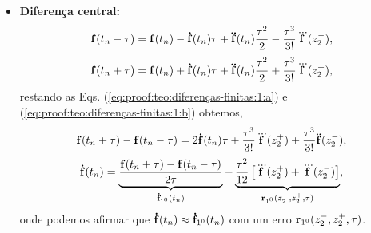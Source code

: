 \begin{myproofT}
\begin{itemize}
\item \textbf{Diferença central:} 
\begin{equation}\label{eq:proof:teo:diferenças-finitas:1:a}
\VECTOR{f}(t_n-\ToS) = \VECTOR{f}(t_n)-\DTVECTOR{f}(t_n)\ToS +\DDTVECTOR{f}(t_n) \frac{\ToS^2}{2}-\frac{\ToS^3}{3!}\DDDTVECTOR{f}(z_{2}^{-}),
\end{equation}
\begin{equation}\label{eq:proof:teo:diferenças-finitas:1:b}
\VECTOR{f}(t_n+\ToS) = \VECTOR{f}(t_n)+\DTVECTOR{f}(t_n)\ToS +\DDTVECTOR{f}(t_n) \frac{\ToS^2}{2}+\frac{\ToS^3}{3!}\DDDTVECTOR{f}(z_{2}^{+}),
\end{equation}
restando as Eqs. (\ref{eq:proof:teo:diferenças-finitas:1:a}) e (\ref{eq:proof:teo:diferenças-finitas:1:b}) obtemos,
\begin{equation}
\VECTOR{f}(t_n+\ToS) - \VECTOR{f}(t_n-\ToS) = 2\DTVECTOR{f}(t_n)\ToS +\frac{\ToS^3}{3!}\DDDTVECTOR{f}(z_{2}^{+}) + \frac{\ToS^3}{3!}\DDTVECTOR{f}(z_{2}^{-}),
\end{equation}
\begin{equation}
\DTVECTOR{f}(t_n) = \underbrace{\frac{\VECTOR{f}(t_n+\ToS) - \VECTOR{f}(t_n-\ToS)}{2\ToS}}_{\DTVECTOR{f}_{1^{0}}(t_n)} - 
\underbrace{\frac{\ToS^2}{12} \left[\DDDTVECTOR{f}(z_{2}^{+}) + \DDDTVECTOR{f}(z_{2}^{-})\right]}_{\VECTOR{R}_{1^{0}}(z_{2}^{-},z_{2}^{+},\ToS)},
\end{equation}
onde podemos afirmar que $\DTVECTOR{f}(t_n)\approx \DTVECTOR{f}_{1^{0}}(t_n)$ 
com um erro $\VECTOR{R}_{1^{0}}(z_{2}^{-},z_{2}^{+},\ToS)$.
\end{itemize}
\end{myproofT}
